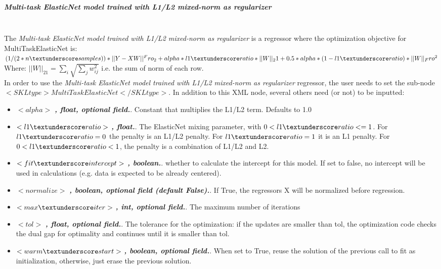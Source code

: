 \subparagraph{Multi-task ElasticNet model trained with L1/L2 mixed-norm as regularizer}
\mbox{}
\\The \textit{Multi-task ElasticNet model trained with L1/L2 mixed-norm as regularizer} is a regressor where the optimization objective for MultiTaskElasticNet is:
$(1 / (2 * n \textunderscore samples)) * ||Y - XW||^Fro_2
+ alpha * l1 \textunderscore ratio * ||W||_21
+ 0.5 * alpha * (1 - l1 \textunderscore ratio) * ||W||_Fro^2$
Where:
$||W||_21 = \sum_i \sqrt{\sum_j w_{ij}^2}$
i.e. the sum of norm of each row.
\\In order to use the \textit{Multi-task ElasticNet model trained with L1/L2 mixed-norm as regularizer} regressor, the user needs to set the sub-node $<SKLtype>MultiTaskElasticNet</SKLtype>$.
In addition to this XML node, several others need (or not) to be inputted:
\begin{itemize}
  \item $<alpha>$ \textbf{\textit{, float, optional field.}}. Constant that multiplies the L1/L2 term. Defaults to 1.0
  \item $<l1 \textunderscore ratio>$ \textbf{\textit{, float.}}. The ElasticNet mixing parameter, with $0 < l1 \textunderscore ratio <= 1$. For $l1 \textunderscore ratio = 0$ the penalty is an L1/L2 penalty. For $l1 \textunderscore ratio = 1$ it is an L1 penalty. For $0 < l1 \textunderscore ratio < 1$, the penalty is a combination of L1/L2 and L2.
  \item $<fit \textunderscore intercept>$ \textbf{\textit{, boolean.}}. whether to calculate the intercept for this model. If set to false, no intercept will be used in calculations (e.g. data is expected to be already centered).
  \item $<normalize>$ \textbf{\textit{, boolean, optional field (default False).}}. If True, the regressors X will be normalized before regression.
  \item $<max \textunderscore iter>$ \textbf{\textit{, int, optional field.}}. The maximum number of iterations
  \item $<tol>$ \textbf{\textit{, float, optional field.}}. The tolerance for the optimization: if the updates are smaller than tol, the optimization code checks the dual gap for optimality and continues until it is smaller than tol.
  \item $<warm \textunderscore start>$ \textbf{\textit{, boolean, optional field.}}. When set to True, reuse the solution of the previous call to fit as initialization, otherwise, just erase the previous solution.
\end{itemize}

